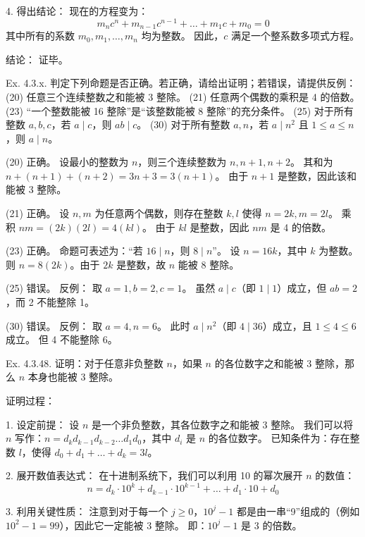 \begin{questions}
\begin{solution}
4. 得出结论：
   现在的方程变为：
   \[ m_n c^n + m_{n-1} c^{n-1} + \dots + m_1 c + m_0 = 0 \]
   其中所有的系数 $m_0, m_1, \dots, m_n$ 均为整数。
   因此，$c$ 满足一个整系数多项式方程。

结论： 证毕。
\end{solution}

\question
Ex. 4.3.x. 判定下列命题是否正确。若正确，请给出证明；若错误，请提供反例：
(20) 任意三个连续整数之和能被 3 整除。
(21) 任意两个偶数的乘积是 4 的倍数。
(23) “一个整数能被 16 整除”是“该整数能被 8 整除”的充分条件。
(25) 对于所有整数 $a, b, c$，若 $a \mid c$，则 $ab \mid c$。
(30) 对于所有整数 $a, n$，若 $a \mid n^2$ 且 $1 \le a \le n$，则 $a \mid n$。

\begin{solution}
(20) 正确。
设最小的整数为 $n$，则三个连续整数为 $n, n+1, n+2$。
其和为 $n + (n+1) + (n+2) = 3n + 3 = 3(n+1)$。
由于 $n+1$ 是整数，因此该和能被 3 整除。

(21) 正确。
设 $n, m$ 为任意两个偶数，则存在整数 $k, l$ 使得 $n = 2k, m = 2l$。
乘积 $nm = (2k)(2l) = 4(kl)$。
由于 $kl$ 是整数，因此 $nm$ 是 4 的倍数。

(23) 正确。
命题可表述为：“若 $16 \mid n$，则 $8 \mid n$”。
设 $n = 16k$，其中 $k$ 为整数。
则 $n = 8(2k)$。由于 $2k$ 是整数，故 $n$ 能被 8 整除。

(25) 错误。
反例： 取 $a = 1, b = 2, c = 1$。
虽然 $a \mid c$（即 $1 \mid 1$）成立，但 $ab = 2$，而 2 不能整除 1。

(30) 错误。
反例： 取 $a = 4, n = 6$。
此时 $a \mid n^2$（即 $4 \mid 36$）成立，且 $1 \le 4 \le 6$ 成立。
但 4 不能整除 6。
\end{solution}

\question
Ex. 4.3.48. 证明：对于任意非负整数 $n$，如果 $n$ 的各位数字之和能被 3 整除，那么 $n$ 本身也能被 3 整除。

\begin{solution}
证明过程：

1. 设定前提：
   设 $n$ 是一个非负整数，其各位数字之和能被 3 整除。
   我们可以将 $n$ 写作：$n = d_k d_{k-1} d_{k-2} \dots d_1 d_0$，其中 $d_i$ 是 $n$ 的各位数字。
   已知条件为：存在整数 $l$，使得 $d_0 + d_1 + \dots + d_k = 3l$。

2. 展开数值表达式：
   在十进制系统下，我们可以利用 10 的幂次展开 $n$ 的数值：
   \[ n = d_k \cdot 10^k + d_{k-1} \cdot 10^{k-1} + \dots + d_1 \cdot 10 + d_0 \]

3. 利用关键性质：
   注意到对于每一个 $j \ge 0$，$10^j - 1$ 都是由一串“9”组成的（例如 $10^2 - 1 = 99$），因此它一定能被 3 整除。
   即：$10^j - 1$ 是 3 的倍数。


\end{solution}
\end{questions}
